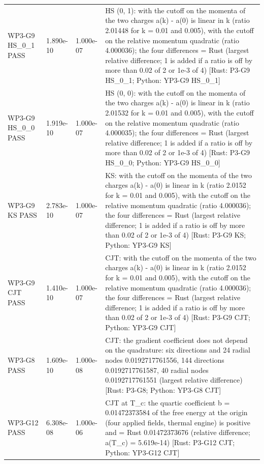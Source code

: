\documentclass[aps,prd,onecolumn,superscriptaddress,nofootinbib,floatfix,longbibliography]{revtex4-2}
\begin{document}
\begin{longtable}{p{}p{}p{}p{}}
WP3-G9 HS\_0\_1 \newline PASS & 1.890e-10 & 1.000e-07 & HS (0, 1): with the cutoff on the momenta of the two charges a(k) - a(0) is linear in \textbar{}k\textbar{} (ratio 2.01448 for k = 0.01 and 0.005), with the cutoff on the relative momentum quadratic (ratio 4.000036); the four differences = Rust (largest relative difference; 1 is added if a ratio is off by more than 0.02 of 2 or 1e-3 of 4) [Rust: P3-G9 HS\_0\_1; Python: YP3-G9 HS\_0\_1] \\
WP3-G9 HS\_0\_0 \newline PASS & 1.919e-10 & 1.000e-07 & HS (0, 0): with the cutoff on the momenta of the two charges a(k) - a(0) is linear in \textbar{}k\textbar{} (ratio 2.01532 for k = 0.01 and 0.005), with the cutoff on the relative momentum quadratic (ratio 4.000035); the four differences = Rust (largest relative difference; 1 is added if a ratio is off by more than 0.02 of 2 or 1e-3 of 4) [Rust: P3-G9 HS\_0\_0; Python: YP3-G9 HS\_0\_0] \\
WP3-G9 KS \newline PASS & 2.783e-10 & 1.000e-07 & KS: with the cutoff on the momenta of the two charges a(k) - a(0) is linear in \textbar{}k\textbar{} (ratio 2.0152 for k = 0.01 and 0.005), with the cutoff on the relative momentum quadratic (ratio 4.000036); the four differences = Rust (largest relative difference; 1 is added if a ratio is off by more than 0.02 of 2 or 1e-3 of 4) [Rust: P3-G9 KS; Python: YP3-G9 KS] \\
WP3-G9 CJT \newline PASS & 1.410e-10 & 1.000e-07 & CJT: with the cutoff on the momenta of the two charges a(k) - a(0) is linear in \textbar{}k\textbar{} (ratio 2.0152 for k = 0.01 and 0.005), with the cutoff on the relative momentum quadratic (ratio 4.000036); the four differences = Rust (largest relative difference; 1 is added if a ratio is off by more than 0.02 of 2 or 1e-3 of 4) [Rust: P3-G9 CJT; Python: YP3-G9 CJT] \\
WP3-G8 \newline PASS & 1.609e-10 & 1.000e-08 & CJT: the gradient coefficient does not depend on the quadrature: six directions and 24 radial nodes 0.0192717761556, 144 directions 0.0192717761587, 40 radial nodes 0.0192717761551 (largest relative difference) [Rust: P3-G8; Python: YP3-G8 CJT] \\
WP3-G12 \newline PASS & 6.308e-08 & 1.000e-06 & CJT at T\_c: the quartic coefficient b = 0.01472373584 of the free energy at the origin (four applied fields, thermal engine) is positive and = Rust 0.01472373676 (relative difference; a(T\_c) = 5.619e-14) [Rust: P3-G12 CJT; Python: YP3-G12 CJT] \\

\end{longtable}
\end{document}
